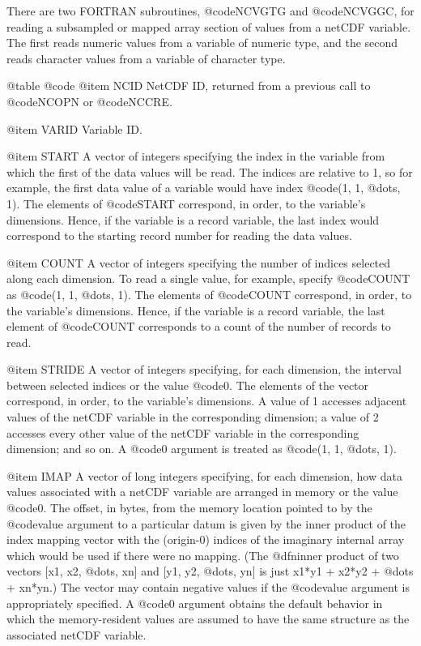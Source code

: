 There are two FORTRAN subroutines, @code{NCVGTG} and @code{NCVGGC}, for
reading a subsampled or mapped array section of values from a netCDF
variable.  The first reads numeric values from a variable of numeric
type, and the second reads character values from a variable of character
type.

@table @code
@item NCID
NetCDF ID, returned from a previous call to @code{NCOPN} or
@code{NCCRE}.

@item VARID
Variable ID.

@item START
A vector of integers specifying the index in the variable from which the
first of the data values will be read.  The indices are relative to 1,
so for example, the first data value of a variable would have index
@code{(1, 1, @dots{}, 1)}.  The elements of @code{START} correspond, in
order, to the variable's dimensions.  Hence, if the variable is a record
variable, the last index would correspond to the starting record number
for reading the data values.

@item COUNT
A vector of integers specifying the number of indices selected
along each dimension.
To read a single value, for
example, specify @code{COUNT} as @code{(1, 1, @dots{}, 1)}.  The
elements of @code{COUNT} correspond, in order, to the variable's
dimensions.  Hence, if the variable is a record variable, the last
element of @code{COUNT} corresponds to a count of the number of records
to read.

@item STRIDE
A vector of integers specifying, for each dimension, the interval
between selected indices or the value @code{0}.
The elements of the vector correspond, in order, to the variable's
dimensions.  A value of 1 accesses adjacent values of the netCDF
variable in the corresponding dimension; a value of 2 accesses every
other value of the netCDF variable in the corresponding dimension; and
so on.  A @code{0} argument is treated as @code{(1, 1, @dots{}, 1)}.

@item IMAP
A vector of long integers specifying, for each dimension, how data
values associated with a netCDF variable are arranged in memory or the
value @code{0}.  The offset, in bytes, from the memory location pointed
to by the @code{value} argument to a particular datum is given by the
inner product of the index mapping vector with the (origin-0)
indices of
the imaginary internal array which would be used if there were no mapping.
(The @dfn{inner product} of two vectors [x1,
x2, @dots{}, xn] and [y1, y2, @dots{}, yn] is just x1*y1 + x2*y2 +
@dots{} + xn*yn.)  The vector may contain negative values if the
@code{value} argument is appropriately specified.  A @code{0} argument
obtains the default behavior in which the memory-resident values are
assumed to have the same structure as the associated netCDF variable.


